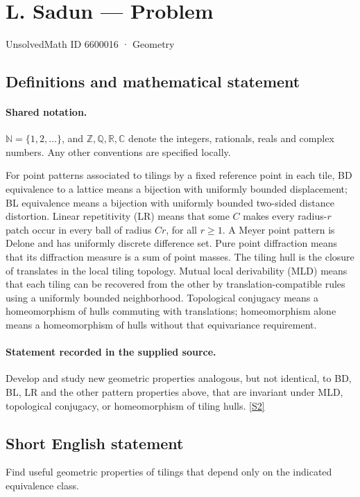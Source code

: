 \documentclass[11pt]{article}
\newcommand{\sref}[2]{\hyperlink{source:#1:#2}{[S#2]}}
\begin{document}
\setcounter{section}{6600015}
\section{L. Sadun — Problem}\label{6600016}
{\small\sffamily UnsolvedMath ID 6600016 · Geometry}
\subsection{Definitions and mathematical statement}

\paragraph{Shared notation.}$\mathbb N=\{1,2,\ldots\}$, and $\mathbb Z,\mathbb Q,\mathbb R,\mathbb C$ denote the integers, rationals, reals and complex numbers. Any other conventions are specified locally.


For point patterns associated to tilings by a fixed reference point in each tile, BD equivalence to a lattice means a bijection with uniformly bounded displacement; BL equivalence means a bijection with uniformly bounded two-sided distance distortion. Linear repetitivity (LR) means that some $C$ makes every radius-$r$ patch occur in every ball of radius $Cr$, for all $r\geq1$. A Meyer point pattern is Delone and has uniformly discrete difference set. Pure point diffraction means that its diffraction measure is a sum of point masses. The tiling hull is the closure of translates in the local tiling topology. Mutual local derivability (MLD) means that each tiling can be recovered from the other by translation-compatible rules using a uniformly bounded neighborhood. Topological conjugacy means a homeomorphism of hulls commuting with translations; homeomorphism alone means a homeomorphism of hulls without that equivariance requirement.
\paragraph{Statement recorded in the supplied source.}
Develop and study new geometric properties analogous, but not identical, to BD, BL, LR and the other pattern properties above, that are invariant under MLD, topological conjugacy, or homeomorphism of tiling hulls. \sref{6600016}{2}
\subsection{Short English statement}
Find useful geometric properties of tilings that depend only on the indicated equivalence class.
\end{document}
